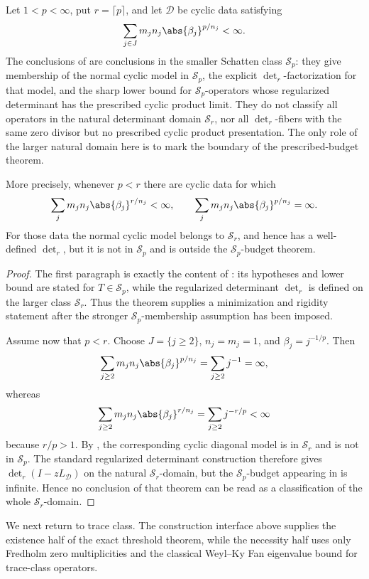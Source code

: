 \begin{proposition}
  \label{prop:regularized-domain-boundary}
  Let \(1<p<\infty\), put \(r=\lceil p\rceil\), and let
  \(\mathcal D\) be cyclic data satisfying
  \[
    \sum_{j\in J}m_jn_j\abs{\beta_j}^{p/n_j}<\infty .
  \]
  The conclusions of
   are conclusions in
  the smaller Schatten class \(\mathcal S_p\): they give membership of the
  normal cyclic model in \(\mathcal S_p\), the explicit
  \(\det_r\)-factorization for that model, and the sharp lower bound for
  \(\mathcal S_p\)-operators whose regularized determinant has the
  prescribed cyclic product limit. They do not classify all operators in
  the natural determinant domain \(\mathcal S_r\), nor all
  \(\det_r\)-fibers with the same zero divisor but no prescribed cyclic
  product presentation.  The only role of the larger natural domain here is
  to mark the boundary of the prescribed-budget theorem.

  More precisely, whenever \(p<r\) there are cyclic data for which
  \[
    \sum_jm_jn_j\abs{\beta_j}^{r/n_j}<\infty,
    \qquad
    \sum_jm_jn_j\abs{\beta_j}^{p/n_j}=\infty .
  \]
  For those data the normal
  cyclic model belongs to \(\mathcal S_r\), and hence has a well-defined
  \(\det_r\), but it is not in \(\mathcal S_p\) and is outside the
  \(\mathcal S_p\)-budget theorem.
\end{proposition}

\begin{proof}
  The first paragraph is exactly the content of
  : its hypotheses and
  lower bound are stated for \(T\in\mathcal S_p\), while the regularized
  determinant \(\det_r\) is defined on the larger class \(\mathcal S_r\).
  Thus the theorem supplies a minimization and rigidity statement after
  the stronger \(\mathcal S_p\)-membership assumption has been imposed.

  Assume now that \(p<r\). Choose
  \(J=\{j\ge2\}\), \(n_j=m_j=1\), and
  \(\beta_j=j^{-1/p}\). Then
  \[
    \sum_{j\ge2}m_jn_j\abs{\beta_j}^{p/n_j}
    =\sum_{j\ge2}j^{-1}=\infty,
  \]
  whereas
  \[
    \sum_{j\ge2}m_jn_j\abs{\beta_j}^{r/n_j}
    =\sum_{j\ge2}j^{-r/p}<\infty
  \]
  because \(r/p>1\). By
  , the corresponding cyclic
  diagonal model is in \(\mathcal S_r\) and is not in \(\mathcal S_p\).
  The standard regularized determinant construction therefore gives
  \(\det_r(I-zL_{\mathcal D})\) on the natural \(\mathcal S_r\)-domain,
  but the \(\mathcal S_p\)-budget appearing in
   is infinite. Hence no
  conclusion of that theorem can be read as a classification of the whole
  \(\mathcal S_r\)-domain.
\end{proof}

We next return to trace class. The construction interface above supplies
the existence half of the exact threshold theorem, while the necessity
half uses only Fredholm zero multiplicities and the classical Weyl--Ky Fan
eigenvalue bound for trace-class operators.
